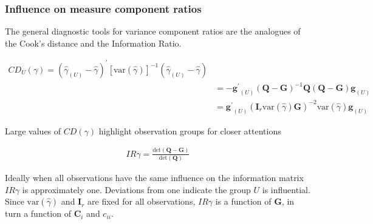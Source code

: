 \documentclass[12pt, a4paper]{report}
\theoremstyle{plain}
\theoremstyle{definition}
\theoremstyle{remark}
\begin{document}
		
		
		
		
		
		
	\subsubsection{Influence on measure component ratios}               %
	The general diagnostic tools for variance component ratios are the analogues of the Cook's distance and the Information Ratio.
	
	
	\begin{eqnarray*}
		CD_{U}(\gamma) = (\hat{\gamma}_{(U)} - \hat{\gamma})^{\prime}[\mbox{var}(\hat{\gamma})]^{-1}(\hat{\gamma}_{(U)} - \hat{\gamma})\\
		&= -\boldsymbol{g^{\prime}}_{(U)} (\boldsymbol{Q}-\boldsymbol{G})^{-1}\boldsymbol{Q}(\boldsymbol{Q}-\boldsymbol{G})\boldsymbol{g}_{(U)} \\
		&= \boldsymbol{g^{\prime}}_{(U)} (\boldsymbol{I}_{r}  \mbox{var}(\hat{\gamma})\boldsymbol{G})^{-2}\mbox{var}(\hat{\gamma})\boldsymbol{g}_{(U)}
	\end{eqnarray*}
	
	Large values of $CD(\gamma)$ highlight observation groups for closer attentions
	
	
	\begin{eqnarray*}
		IR{\gamma}  = \frac{\mbox{det}(\boldsymbol{Q} - \boldsymbol{G})}{\mbox{det}(\boldsymbol{Q})}
	\end{eqnarray*}
	
	Ideally when all observations have the same influence on the information matrix $IR{\gamma}$ is approximately one.
	Deviations from one indicate the group $U$ is influential. Since $\mbox{var}(\hat{\gamma})$ and $\boldsymbol{I}_{r}$ are fixed for all observations, $IR{\gamma}$ is a function of $\boldsymbol{G}$, in turn a function of $\boldsymbol{C}_{i}$ and $c_{ii}$.
	
\end{document}
